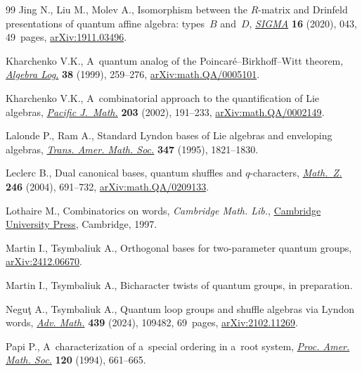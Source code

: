 \begin{thebibliography}{99}
Jing N., Liu M., Molev A., Isomorphism between the {$R$}-matrix and {D}rinfeld
 presentations of quantum affine algebra: types~{$B$} and~{$D$},
 \href{https://doi.org/10.3842/SIGMA.2020.043}{\textit{SIGMA}} \textbf{16}
 (2020), 043, 49~pages,
 \href{http://arxiv.org/abs/1911.03496}{arXiv:1911.03496}.

Kharchenko V.K., A~quantum analog of the {P}oincar\'e--{B}irkhoff--{W}itt
 theorem, \href{https://doi.org/10.1007/BF02671731}{\textit{Algebra Log.}}
 \textbf{38} (1999), 259--276,
 \href{http://arxiv.org/abs/math.QA/0005101}{arXiv:math.QA/0005101}.

Kharchenko V.K., A~combinatorial approach to the quantification of {L}ie
 algebras, \href{https://doi.org/10.2140/pjm.2002.203.191}{\textit{Pacific
 J.~Math.}} \textbf{203} (2002), 191--233,
 \href{http://arxiv.org/abs/math.QA/0002149}{arXiv:math.QA/0002149}.

Lalonde P., Ram A., Standard {L}yndon bases of {L}ie algebras and enveloping
 algebras, \href{https://doi.org/10.2307/2154977}{\textit{Trans. Amer. Math.
 Soc.}} \textbf{347} (1995), 1821--1830.

Leclerc B., Dual canonical bases, quantum shuffles and {$q$}-characters,
 \href{https://doi.org/10.1007/s00209-003-0609-9}{\textit{Math.~Z.}}
 \textbf{246} (2004), 691--732,
 \href{http://arxiv.org/abs/math.QA/0209133}{arXiv:math.QA/0209133}.

Lothaire M., Combinatorics on words, \textit{Cambridge Math. Lib.},
 \href{https://doi.org/10.1017/CBO9780511566097}{Cambridge University Press},
 Cambridge, 1997.

Martin I., Tsymbaliuk A., Orthogonal bases for two-parameter quantum groups,
 \href{http://arxiv.org/abs/2412.06670}{arXiv:2412.06670}.

Martin I., Tsymbaliuk A., Bicharacter twists of quantum groups, {i}n
 preparation.

Negu\c{t} A., Tsymbaliuk A., Quantum loop groups and shuffle algebras via
 {L}yndon words, \href{https://doi.org/10.1016/j.aim.2023.109482}{\textit{Adv.
 Math.}} \textbf{439} (2024), 109482, 69~pages,
 \href{http://arxiv.org/abs/2102.11269}{arXiv:2102.11269}.

Papi P., A~characterization of a~special ordering in a~root system,
 \href{https://doi.org/10.2307/2160454}{\textit{Proc. Amer. Math. Soc.}}
 \textbf{120} (1994), 661--665.


\end{thebibliography}
